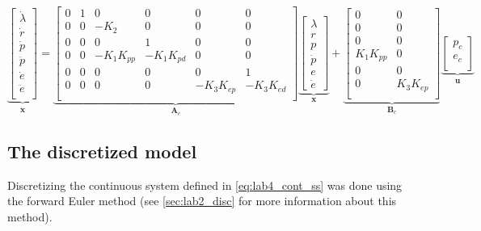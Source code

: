 \documentclass[../main.tex]{subfiles}
\begin{document}
\begin{equation}\label{eq:lab4_cont_ss}
	\underbrace{\begin{bmatrix}
			\dot \lambda \\
			\dot r \\
			\dot p \\
			\ddot p \\
			\dot e \\
			\ddot e \\
	\end{bmatrix}}_{\bm{\dot x}} = 
	\underbrace{
		\begin{bmatrix}
			0 & 1 & 0 & 0 & 0 & 0\\
			0 & 0 & -K_2 & 0 & 0 & 0\\
			0 & 0 & 0 & 1 & 0 & 0\\
			0 & 0 & -K_1 K_{pp} &  -K_1 K_{pd} & 0 & 0\\
			0 & 0 & 0 & 0 & 0 & 1 \\
			0 & 0 & 0 & 0 & -K_3K_{ep} & -K_3K_{ed} \\
		\end{bmatrix}
	}_{\bm A_c}
	\underbrace{
		\begin{bmatrix}
			\lambda \\ r \\ p \\ \dot{p} \\ e \\ \dot{e}
		\end{bmatrix}
	}_{\bm x}
	+
	\underbrace{
		\begin{bmatrix}
			0 & 0 \\
			0 & 0\\
			0 & 0\\
			K_1 K_{pp} & 0\\
			0 & 0 \\
			0 & K_3K_{ep} \\
		\end{bmatrix}
	}_{\bm B_c} 
	\underbrace{
		\begin{bmatrix}
			p_c \\
			e_c \\
		\end{bmatrix}
	}_{\bm u}
\end{equation}

\subsection{The discretized model}
Discretizing the continuous system defined in \cref{eq:lab4_cont_ss} was done using the forward Euler method (see \cref{sec:lab2_disc} for more information about this method).
\end{document}
